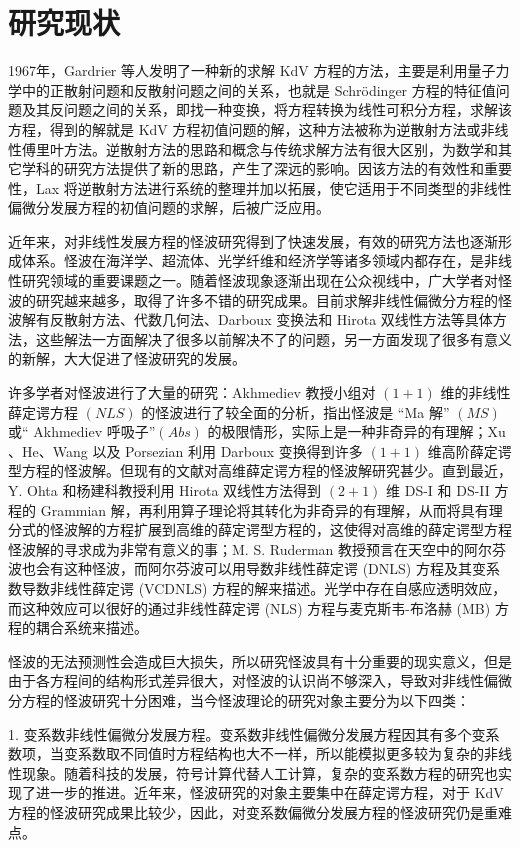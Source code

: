 \section{研究现状}
1967年，Gardrier 等人发明了一种新的求解 KdV 方程的方法，主要是利用量子力学中的正散射问题和反散射问题之间的关系，也就是 Schr\"{o}dinger 方程的特征值问题及其反问题之间的关系，即找一种变换，将方程转换为线性可积分方程，求解该方程，得到的解就是 KdV 方程初值问题的解，这种方法被称为逆散射方法或非线性傅里叶方法。逆散射方法的思路和概念与传统求解方法有很大区别，为数学和其它学科的研究方法提供了新的思路，产生了深远的影响。因该方法的有效性和重要性，Lax 将逆散射方法进行系统的整理并加以拓展，使它适用于不同类型的非线性偏微分发展方程的初值问题的求解，后被广泛应用。

近年来，对非线性发展方程的怪波研究得到了快速发展，有效的研究方法也逐渐形成体系。怪波在海洋学、超流体、光学纤维和经济学等诸多领域内都存在，是非线性研究领域的重要课题之一。随着怪波现象逐渐出现在公众视线中，广大学者对怪波的研究越来越多，取得了许多不错的研究成果。目前求解非线性偏微分方程的怪波解有反散射方法、代数几何法、Darboux 变换法和 Hirota 双线性方法等具体方法，这些解法一方面解决了很多以前解决不了的问题，另一方面发现了很多有意义的新解，大大促进了怪波研究的发展。

许多学者对怪波进行了大量的研究：Akhmediev 教授小组对 $(1+1)$ 维的非线性薛定谔方程 $(NLS)$ 的怪波进行了较全面的分析，指出怪波是 “Ma 解” $(MS)$或“ Akhmediev 呼吸子”$(Abs)$ 的极限情形，实际上是一种非奇异的有理解；Xu 、He、Wang 以及 Porsezian 利用 Darboux 变换得到许多 $(1+1)$ 维高阶薛定谔型方程的怪波解。但现有的文献对高维薛定谔方程的怪波解研究甚少。直到最近，Y. Ohta 和杨建科教授利用 Hirota 双线性方法得到 $(2+1)$ 维 DS-I 和 DS-II 方程的 Grammian 解，再利用算子理论将其转化为非奇异的有理解，从而将具有理分式的怪波解的方程扩展到高维的薛定谔型方程的，这使得对高维的薛定谔型方程怪波解的寻求成为非常有意义的事；M. S. Ruderman 教授预言在天空中的阿尔芬波也会有这种怪波，而阿尔芬波可以用导数非线性薛定谔 (DNLS) 方程及其变系数导数非线性薛定谔 (VCDNLS) 方程的解来描述。光学中存在自感应透明效应，而这种效应可以很好的通过非线性薛定谔 (NLS) 方程与麦克斯韦-布洛赫 (MB) 方程的耦合系统来描述。

怪波的无法预测性会造成巨大损失，所以研究怪波具有十分重要的现实意义，但是由于各方程间的结构形式差异很大，对怪波的认识尚不够深入，导致对非线性偏微分方程的怪波研究十分困难，当今怪波理论的研究对象主要分为以下四类：

1. 变系数非线性偏微分发展方程。变系数非线性偏微分发展方程因其有多个变系数项，当变系数取不同值时方程结构也大不一样，所以能模拟更多较为复杂的非线性现象。随着科技的发展，符号计算代替人工计算，复杂的变系数方程的研究也实现了进一步的推进。近年来，怪波研究的对象主要集中在薛定谔方程，对于 KdV 方程的怪波研究成果比较少，因此，对变系数偏微分发展方程的怪波研究仍是重难点。

